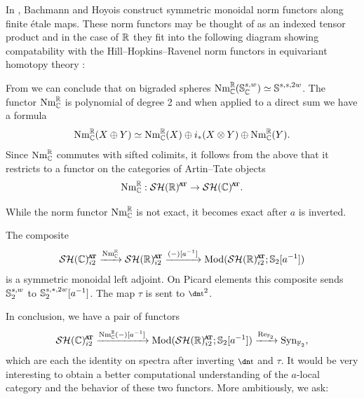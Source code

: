\begin{rec} \label{rec:norms}
  In \cite{norms}, Bachmann and Hoyois construct symmetric monoidal norm functors along finite \'etale maps.
  These norm functors may be thought of as an indexed tensor product and in the case of $\mathbb{R}$ they fit into the following diagram showing compatability with the Hill--Hopkins--Ravenel norm functors in equivariant homotopy theory \cite[Section 11]{norms}:
  \begin{center}
  \end{center}
  From \cite[{Example 3.5, Lemma 4.4, Example 4.10}]{norms} we can conclude that on bigraded spheres $\mathrm{Nm}_{\mathbb{C}}^{\mathbb{R}}(\operatorname{\mathbb{S}}_{\mathbb{C}}^{s,w}) \simeq \operatorname{\mathbb{S}}^{s,s,2w}$. The functor $\mathrm{Nm}_{\mathbb{C}}^{\mathbb{R}}$ is polynomial of degree 2 and when applied to a direct sum we have a formula \cite[Corollary 5.13]{norms}
  \[ \mathrm{Nm}_{\mathbb{C}}^{\mathbb{R}}(X \oplus Y) \simeq \mathrm{Nm}_{\mathbb{C}}^{\mathbb{R}}(X) \oplus i_*(X \otimes Y) \oplus \mathrm{Nm}_{\mathbb{C}}^{\mathbb{R}}(Y). \]
  Since $\mathrm{Nm}_{\mathbb{C}}^{\mathbb{R}}$ commutes with sifted colimits, it follows from the above that it restricts to a functor on the categories of Artin--Tate objects
  \[\mathrm{Nm}_{\C}^\R : \SHR^{\at} \to \SHC^{\at}.\]
\end{rec}

While the norm functor $\mathrm{Nm}_{\mathbb{C}}^{\mathbb{R}}$ is not exact, it becomes exact after $a$ is inverted.

\begin{prop}
  The composite
  \[ \SHC_{i2}^{\at} \xrightarrow{\mathrm{Nm}_\C^\R} \SHRat \xrightarrow{(-)[a^{-1}]} \Mod ( \SHRat ; \Ss_2[a^{-1}] ) \]
  is a symmetric monoidal left adjoint.
  On Picard elements this composite sends $\operatorname{\mathbb{S}}_2^{s,w}$ to $\operatorname{\mathbb{S}}_2^{s,*,2w}[a^{-1}]$.
  The map $\tau$ is sent to $\ta^2$.
\end{prop}

In conclusion, we have a pair of functors 
\[\SHC^{\at}_{i2} \xrightarrow{\mathrm{Nm}_\C^\R(-)[a^{-1}]} \Mod( \SHRat; \Ss_2 [a^{-1}]) \xrightarrow{\Re_{\F_2}} \Syn_{\F_2},\]
which are each the identity on spectra after inverting $\ta$ and $\tau$.
It would be very interesting to obtain a better computational understanding of the $a$-local category and the behavior of these two functors. More ambitiously, we ask:

